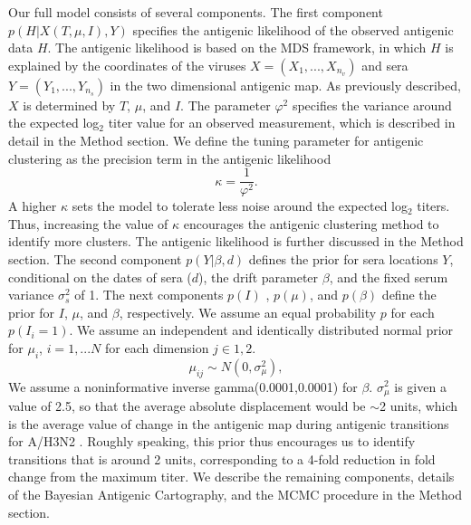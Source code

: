 \documentclass[11pt,oneside,letterpaper]{article}
\newcommand{\mdssd}{\varphi}						%
\begin{document}
Our full model consists of several components.
The first component $p(H|X(T, \mu, I),Y )$ specifies the antigenic likelihood of the observed antigenic data $H$.
The antigenic likelihood is based on the MDS framework, in which $H$ is explained by the coordinates of the viruses $X=(X_1, ..., X_{n_v} )$ and sera $Y = (Y_1, ..., Y_{n_{s}} )$  in the two dimensional antigenic map.
As previously described, $X$ is determined by $T$, $\mu$, and $I$.
The parameter $\mdssd^2$ specifies the variance around the expected log$_2$ titer value for an observed measurement, which is described in detail in the Method section.
We define the tuning parameter for antigenic clustering as the precision term in the antigenic likelihood
\begin{equation}
  \kappa = \frac{1}{\mdssd^2}.
\end{equation}
A higher $\kappa$ sets the model to tolerate less noise around the expected log$_2$ titers.
Thus, increasing the value of $\kappa$ encourages the antigenic clustering method to identify more clusters.
The antigenic likelihood is further discussed in the Method section.
The second component $p(Y|  \beta , d)$ defines the prior for sera locations $Y$, conditional on the dates of sera ($d$), the drift parameter $\beta$, and the fixed serum variance $\sigma^2_s$ of 1. 
The next components $p(I)$ , $p(\mu)$, and $p(\beta)$ define the prior for $I$, $\mu$, and $\beta$, respectively.
We assume an equal probability $p$ for each $p(I_i = 1)$.
We assume an independent and identically distributed normal prior for $\mu_i$, $i=1,...N$ for each dimension $j \in {1,2}$.
\begin{equation}
   \mu_{ij}  \sim N( 0 , \sigma^2_\mu)			,
\end{equation}
We assume a noninformative inverse gamma(0.0001,0.0001) for $\beta$.
$\sigma^2_\mu$ is given a value of 2.5, so that the average absolute displacement would be $\sim$2 units, which is the average value of change in the antigenic map during antigenic transitions for A/H3N2 \cite{jong_antigenic_2007}.
Roughly speaking, this prior thus encourages us to identify transitions that is around 2 units, corresponding to a 4-fold reduction in fold change from the maximum titer.
We describe the remaining components, details of the Bayesian Antigenic Cartography, and the MCMC procedure in the Method section.



\newpage
\end{document}
